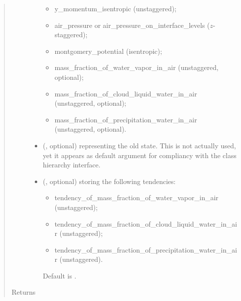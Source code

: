 \documentclass[letterpaper,10pt,english]{sphinxmanual}
\begin{document}
\begin{fulllineitems}
\begin{fulllineitems}
\begin{quote}
\begin{description}
\begin{itemize}
\begin{itemize}
\item {} 
y\_momentum\_isentropic (unstaggered);

\item {} 
air\_pressure or air\_pressure\_on\_interface\_levels (\(z\)-staggered);

\item {} 
montgomery\_potential (isentropic);

\item {} 
mass\_fraction\_of\_water\_vapor\_in\_air (unstaggered, optional);

\item {} 
mass\_fraction\_of\_cloud\_liquid\_water\_in\_air (unstaggered, optional);

\item {} 
mass\_fraction\_of\_precipitation\_water\_in\_air (unstaggered, optional).

\end{itemize}


\item {} 
 (, optional) \textendash{} {\hyperref[\detokenize{api:tasmania.storages.state_isentropic.StateIsentropic}]{}} representing the old state.
This is not actually used, yet it appears as default argument for compliancy with
the class hierarchy interface.

\item {} 
 (, optional) \textendash{} 
{\hyperref[\detokenize{api:tasmania.storages.grid_data.GridData}]{}} storing the following tendencies:
\begin{itemize}
\item {} 
tendency\_of\_mass\_fraction\_of\_water\_vapor\_in\_air (unstaggered);

\item {} 
tendency\_of\_mass\_fraction\_of\_cloud\_liquid\_water\_in\_air (unstaggered);

\item {} 
tendency\_of\_mass\_fraction\_of\_precipitation\_water\_in\_air (unstaggered).

\end{itemize}

Default is .


\end{itemize}

\item[{Returns}] \leavevmode


\end{description}
\end{quote}
\end{fulllineitems}
\end{fulllineitems}
\end{document}
